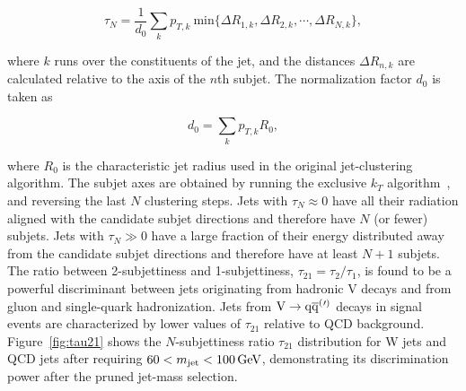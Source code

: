 \begin{equation}
\tau_N = \frac{1}{d_0} \sum_{k} p_{T,k}~\mathrm{min} \{\Delta R_{1,k},\Delta R_{2,k},\cdots,\Delta R_{N,k}\},
\end{equation}

where $k$ runs over the constituents of the jet, and the distances $\Delta R_{n,k}$ are calculated relative to the axis of the $n$th subjet. %
The normalization factor $d_0$ is taken as

\begin{equation}
d_0 = \sum_{k} p_{T,k} R_{0},
\end{equation}

where $R_0$ is the characteristic jet radius used in the original jet-clustering algorithm. The subjet axes are obtained by running the exclusive $k_T$ algorithm~\cite{Ellis:1993tq}, and reversing the last $N$ clustering steps.
Jets with $\tau_N \approx 0$ have all their radiation aligned with the candidate subjet directions and therefore have $N$ (or fewer) subjets. Jets with $\tau_N \gg 0$ have a large fraction of their energy distributed away from the candidate subjet directions and therefore have at least $N+1$ subjets.
The ratio between 2-subjettiness and 1-subjettiness, $\tau_{21} = \tau_{2}/\tau_{1}$, is found to be a powerful discriminant between jets originating from hadronic V decays and from gluon and single-quark hadronization. Jets from $\mathrm{V}\to\mathrm{q}\overline{\mathrm{q}}^({}'^){}$ decays in signal events are characterized by lower values of $\tau_{21}$ relative to QCD background.
Figure~\ref{fig:tau21} shows the $N$-subjettiness ratio $\tau_{21}$ distribution for W jets and QCD jets after requiring $60 < m_{\text{jet}} < 100\,\text{Ge\hspace{-.08em}V}$, demonstrating its discrimination power after the pruned jet-mass selection. %

